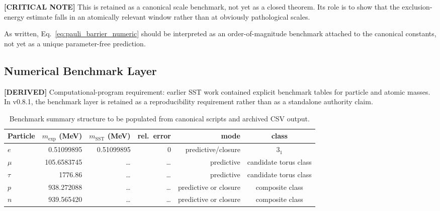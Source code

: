 \documentclass[11pt]{article}
\theoremstyle{definition}
\theoremstyle{plain}
\theoremstyle{remark}
\begin{document}
        \textbf{[CRITICAL NOTE]} This is retained as a canonical scale benchmark, not yet as a closed theorem. Its role is
        to show that the exclusion-energy estimate falls in an atomically relevant window rather than at obviously
        pathological scales.

        As written, Eq.~\eqref{eq:pauli_barrier_numeric} should be interpreted as an order-of-magnitude benchmark attached to the canonical constants, not yet as a unique parameter-free prediction.

    \subsection{Numerical Benchmark Layer}
        \label{subsec:integration_benchmarks}

        \textbf{[DERIVED]} Computational-program requirement: earlier SST work contained explicit benchmark tables for particle and
        atomic masses. In v0.8.1, the benchmark layer is retained as a reproducibility requirement rather than as a
        standalone authority claim.

        \begin{table}[h]
        \centering
        \caption{Benchmark summary structure to be populated from canonical scripts and archived CSV output.}
        \label{tab:benchmark_summary_structure}
        \begin{tabular}{lrrrrc}
        \hline
        Particle & $m_{\mathrm{exp}}$ (MeV) & $m_{\mathrm{SST}}$ (MeV) & rel.\ error & mode & class \\
        \hline
        $e$   & 0.51099895 & 0.51099895 & 0 & predictive/closure & $3_1$ \\
        $\mu$ & 105.6583745 & \dots & \dots & predictive & candidate torus class \\
        $\tau$& 1776.86 & \dots & \dots & predictive & candidate torus class \\
        $p$   & 938.272088 & \dots & \dots & predictive or closure & composite class \\
        $n$   & 939.565420 & \dots & \dots & predictive or closure & composite class \\
        \hline
        \end{tabular}
        \end{table}
\end{document}
